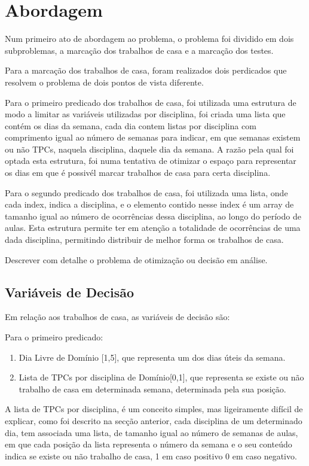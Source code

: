 \documentclass{llncs}
\begin{document}
\section{Abordagem}
%
Num primeiro ato de abordagem ao problema, o problema foi dividido em dois subproblemas, a marcação dos trabalhos de casa e a marcação dos testes. 

Para a marcação dos trabalhos de casa, foram realizados dois perdicados que resolvem o problema de dois pontos de vista diferente.

Para o primeiro predicado dos trabalhos de casa, foi utilizada uma estrutura de modo a limitar as variáveis utilizadas por disciplina, foi criada uma lista que contém os dias da semana, cada dia contem listas por disciplina com comprimento igual ao número de semanas para indicar, em que semanas existem ou não TPCs, naquela disciplina, daquele dia da semana. A razão pela qual foi optada esta  estrutura, foi numa tentativa de otimizar o espaço para representar os dias em que é possivél marcar trabalhos de casa para certa disciplina.
\newline

Para o segundo predicado dos trabalhos de casa, foi utilizada uma lista, onde cada index, indica a disciplina, e o elemento contido nesse index é um array de tamanho igual ao número de ocorrências dessa disciplina, ao longo do período de aulas. Esta estrutura permite ter em atenção a totalidade de ocorrências de uma dada disciplina, permitindo distribuir de melhor forma os trabalhos de casa.

Descrever com detalhe o problema de otimização ou decisão em análise.

\subsection{Variáveis de Decisão}


Em relação aos trabalhos de casa, as variáveis de decisão são: 

Para o primeiro predicado:
\begin{enumerate}
\item Dia Livre de Domínio [1,5], que representa um dos dias úteis da semana.
\item Lista de TPCs por disciplina de Domínio[0,1], que representa se existe ou não trabalho de casa em determinada semana, determinada pela sua posição.
\end{enumerate}

A lista de TPCs por disciplina, é um conceito simples, mas ligeiramente difícil de explicar, como foi descrito na secção anterior, cada disciplina de um determinado dia, tem associada uma lista, de tamanho igual ao número de semanas de aulas, em que cada posição da lista representa o número da semana e o seu conteúdo indica se existe ou não trabalho de casa, 1 em caso positivo 0 em caso negativo.
\end{document}

